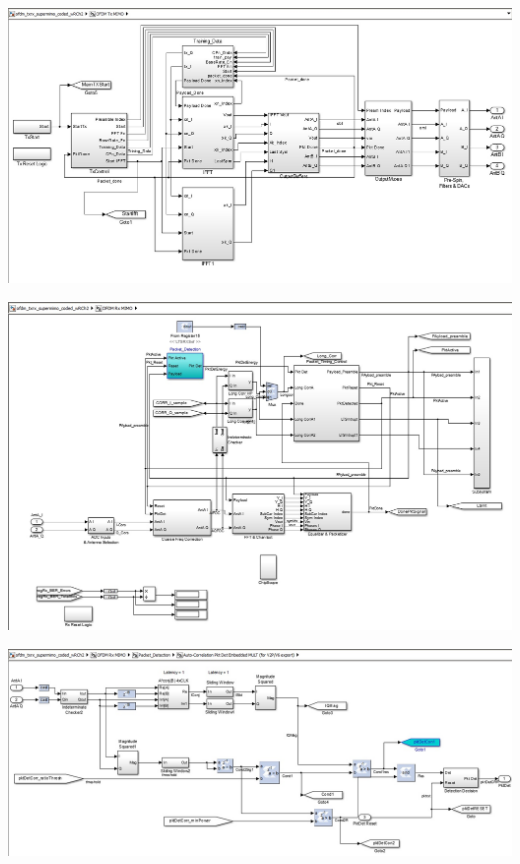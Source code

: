 \begin{center}
\includegraphics[width=\textwidth]{content/fig/txblock.JPG}
\label{tx_block}
\end{center}

\begin{center}
\includegraphics[width=\textwidth]{content/fig/rxblock.JPG}
\label{rx_block}
\end{center}

\begin{center}
\includegraphics[width=\textwidth]{content/fig/autocorrblock.JPG}
\label{autocorrblock}
\end{center}

